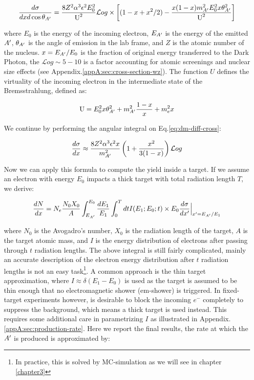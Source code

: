 \begin{equation}
  \label{eq:dm-diff-cross}
  \frac{d\sigma}{dxd\cos{\theta_{A'}}} = \frac{8 Z^2 \alpha^3 \epsilon^2 E^2_0}{\textrm{U}^2} \mathcal{L}og \times \left[ (1 - x + x^2/2) - \frac{x(1-x)m^2_{A'}E^2_0 x \theta^2_{A'}}{\textrm{U}^2} \right]
\end{equation}

where $E_0$ is the energy of the incoming electron, $E_{A'}$ is the energy of the emitted $A'$, $\theta_{A'}$ is the angle of emission in the lab frame, and $Z$ is the atomic number of the nucleus. $x=E_{A'}/E_0$ is the fraction of original energy transferred to the Dark Photon, the $\mathcal{L}og \sim 5 - 10$ is a factor accounting for atomic screenings and nuclear size effects (see Appendix.\ref{appA:sec:cross-section-wz}). The function $U$ defines the virtuality of the incoming electron in the intermediate state of the Bremsstrahlung, defined as:

\begin{equation}
  \label{eq:u-func}
  \textrm{U} = E^2_0 x \theta^2_{A'} + m^2_{A'} \frac{1 - x}{x} + m^2_e x
\end{equation}

We continue by performing the angular integral on Eq.\ref{eq:dm-diff-cross}:

\begin{equation}
  \label{eq:dm-diff-cross-int}
  \frac{d\sigma}{dx} \approx \frac{8 Z^2 \alpha^3 \epsilon^2 x}{m^2_{A'}} \left( 1 + \frac{x^2}{3(1-x)} \right) \mathcal{L}og 
\end{equation}

Now we can apply this formula to compute the yield inside a target. If we assume an electron with energy $E_0$ impacts a thick target with total radiation length $T$, we derive:

\begin{equation}
  \label{eq:dm-general-yield}
  \frac{dN}{dx} = N_e \frac{N_0 X_0}{A} \int_{E_{A'}}^{E_0} \frac{dE_1}{E_1} \int_0^T dt I(E_1;E_0;t) \times E_0 \frac{d\sigma}{dx'}\Big|_{x' = E_{A'}/E_1}
\end{equation}

where $N_0$ is the Avogadro's number, $X_0$ is the radiation length of the target, $A$ is the target atomic mass, and $I$ is the energy distribution of electrons after passing through $t$ radiation lengths. The above integral is still fairly complicated, mainly an accurate description of the electron energy distribution after $t$ radiation lengths is not an easy task\footnote{In practice, this is solved by MC-simulation as we will see in chapter \ref{chapter3}}. A common approach is the thin target approximation, where $I \approx \delta (E_1 - E_0)$ is used as the target is assumed to be thin enough that no electromagnetic shower (em-shower) is triggered. In fixed-target experiments however, is desirable to block the incoming $e^-$ completely to suppress the background, which means a thick target is used instead. This requires some additional care in parametrizing $I$ as illustrated in Appendix.\ref{appA:sec:production-rate}. Here we report the final results, the rate at which the $A'$ is produced is approximated by:

